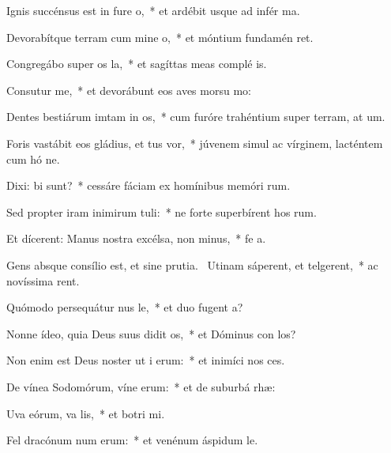 \item Ignis succénsus est in fure o,~* et ardébit usque ad infér ma.
\item Devorabítque terram cum mine o,~* et móntium fundamén ret.
\item Congregábo super os la,~* et sagíttas meas complé  is.
\item Consutur me,~* et devorábunt eos aves morsu mo:
\item Dentes bestiárum imtam in os,~* cum furóre trahéntium super terram, at um.
\item Foris vastábit eos gládius, et tus vor,~* júvenem simul ac vírginem, lacténtem cum hó ne.
\item Dixi: bi sunt?~* cessáre fáciam ex homínibus memóri rum.
\item Sed propter iram inimirum tuli:~* ne forte superbírent hos rum.
\item Et dícerent: Manus nostra excélsa,  non minus,~* fe  a.
\item Gens absque consílio est, et sine prutia.~\pscross{} Utinam sáperent, et telgerent,~* ac novíssima rent.
\item Quómodo persequátur nus le,~* et duo fugent  a?
\item Nonne ídeo, quia Deus suus didit os,~* et Dóminus con los?
\item Non enim est Deus noster ut i erum:~* et inimíci nos  ces.
\item De vínea Sodomórum, víne erum:~* et de suburbá rhæ:
\item Uva eórum, va lis,~* et botri mi.
\item Fel dracónum num erum:~* et venénum áspidum le.
